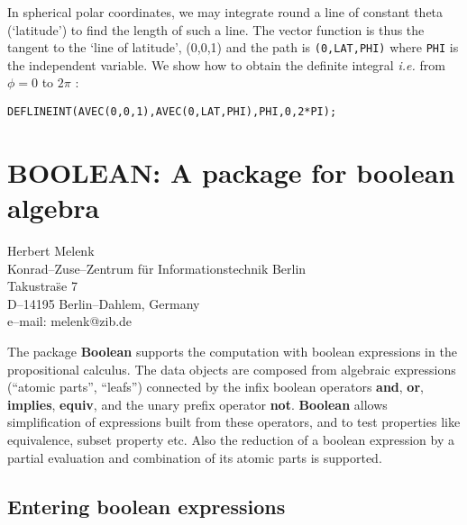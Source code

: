 \documentclass[11pt,letterpaper]{book}
\makeatletter
\newcommand{\underscore}{\_}
\newcommand{\ttindex}[1]{{\renewcommand{\_}{\protect\underscore}%
                          \index{#1@{\tt #1}}}}
\makeatother
\begin{document}
\example{}

In spherical polar coordinates, we may integrate round a line of
constant theta (`latitude') to find the length of such a line. The
vector function is thus the tangent to the `line of latitude', (0,0,1)
and the path is {\tt (0,LAT,PHI)} where {\tt PHI} is the independent
variable. We show how to obtain the definite integral {\em i.e.} from
$\phi=0$ to $2 \pi$ :
{\small\begin{verbatim}
DEFLINEINT(AVEC(0,0,1),AVEC(0,LAT,PHI),PHI,0,2*PI);
\end{verbatim}}

\chapter{BOOLEAN: A package for boolean algebra}
\label{BOOLEAN}

{\footnotesize
\begin{center}
Herbert Melenk\\
Konrad--Zuse--Zentrum f\"ur Informationstechnik Berlin \\
Takustra\"se 7 \\
D--14195 Berlin--Dahlem, Germany \\[0.05in]
e--mail:  melenk@zib.de
\end{center}
}

\ttindex{BOOLEAN}
The package {\bf Boolean} supports the computation with boolean
expressions in the propositional calculus.  The data objects are
composed from algebraic expressions (``atomic parts'', ``leafs'')
connected by the infix boolean operators {\bf and}, {\bf or}, {\bf
implies}, {\bf equiv}, and the unary prefix operator {\bf not}.  {\bf
Boolean} allows simplification of expressions built from these
operators, and to test properties like equivalence, subset property
etc.  Also the reduction of a boolean expression by a partial
evaluation and combination of its atomic parts is supported.

\section{Entering boolean expressions}
\end{document}
